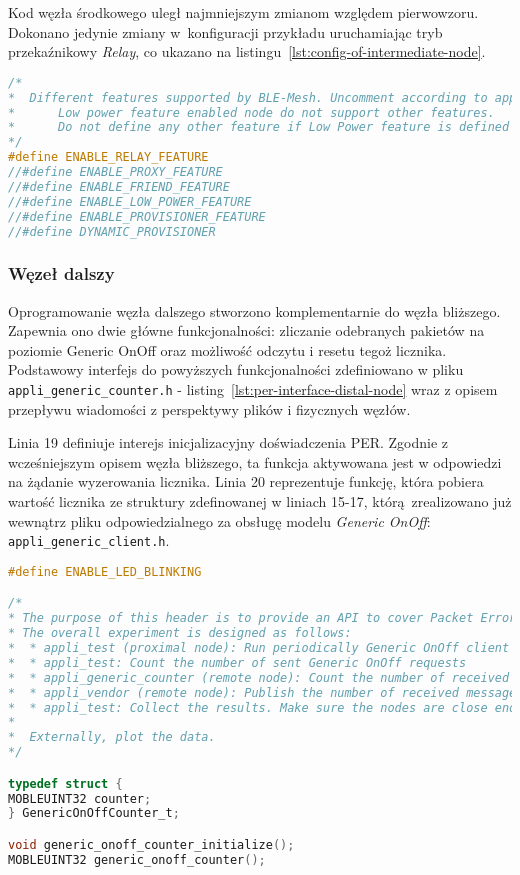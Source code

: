 Kod węzła środkowego uległ najmniejszym zmianom względem pierwowzoru. Dokonano jedynie zmiany w~konfiguracji przykładu
uruchamiając tryb przekaźnikowy \textit{Relay}, co ukazano na listingu~\ref{lst:config-of-intermediate-node}.

\begin{lstlisting}[language=C,
    caption={Konfiguracja węzła środkowego},
    label={lst:config-of-intermediate-node}]
/*
*  Different features supported by BLE-Mesh. Uncomment according to application.
*      Low power feature enabled node do not support other features. 
*      Do not define any other feature if Low Power feature is defined
*/
#define ENABLE_RELAY_FEATURE
//#define ENABLE_PROXY_FEATURE
//#define ENABLE_FRIEND_FEATURE
//#define ENABLE_LOW_POWER_FEATURE
//#define ENABLE_PROVISIONER_FEATURE
//#define DYNAMIC_PROVISIONER
\end{lstlisting}

\subsubsection{Węzeł dalszy}

Oprogramowanie węzła dalszego stworzono komplementarnie do węzła bliższego. Zapewnia ono dwie główne funkcjonalności:
zliczanie odebranych pakietów na poziomie Generic OnOff oraz możliwość odczytu i resetu tegoż licznika. Podstawowy interfejs do 
powyższych funkcjonalności zdefiniowano w pliku \texttt{appli\_generic\_counter.h} - listing~\ref{lst:per-interface-distal-node}
wraz z opisem przepływu wiadomości z perspektywy plików i fizycznych węzłów.

Linia 19 definiuje interejs inicjalizacyjny doświadczenia PER. Zgodnie z wcześniejszym opisem węzła bliższego,
ta funkcja aktywowana jest w odpowiedzi na żądanie wyzerowania licznika. Linia 20 reprezentuje funkcję,
która pobiera wartość licznika ze struktury zdefinowanej w liniach 15-17, którą zrealizowano już wewnątrz
pliku odpowiedzialnego za obsługę modelu \textit{Generic OnOff}: \texttt{appli\_generic\_client.h}.

\begin{lstlisting}[language=C,
    caption={Interfejs eksperymentu PER dla węzła dalszego},
    label={lst:per-interface-distal-node}]
#define ENABLE_LED_BLINKING

/*
* The purpose of this header is to provide an API to cover Packet Error Rate experiment.
* The overall experiment is designed as follows:
*  * appli_test (proximal node): Run periodically Generic OnOff client model (SET-05)
*  * appli_test: Count the number of sent Generic OnOff requests
*  * appli_generic_counter (remote node): Count the number of received messages
*  * appli_vendor (remote node): Publish the number of received messages
*  * appli_test: Collect the results. Make sure the nodes are close enough to get the results
*
*  Externally, plot the data.
*/

typedef struct {
MOBLEUINT32 counter;
} GenericOnOffCounter_t;

void generic_onoff_counter_initialize();
MOBLEUINT32 generic_onoff_counter();
\end{lstlisting}

